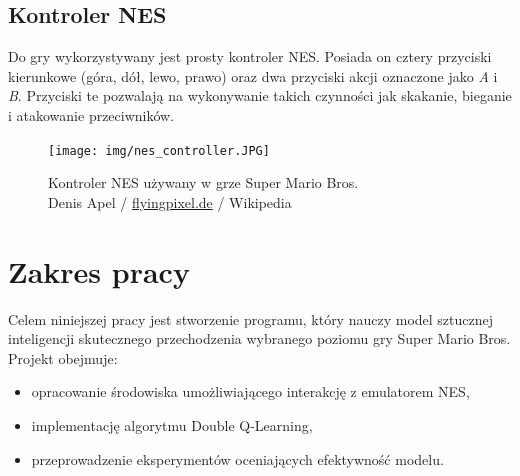 \subsection{Kontroler NES}

Do gry wykorzystywany jest prosty kontroler NES. Posiada on cztery przyciski kierunkowe (góra, dół, lewo, prawo) oraz dwa przyciski akcji oznaczone jako \textit{A} i \textit{B}. Przyciski te pozwalają na wykonywanie takich czynności jak skakanie, bieganie i atakowanie przeciwników.

\begin{figure}[h!]
	\centering
	\texttt{[image: img/nes\_controller.JPG]}
	\caption{Kontroler NES używany w grze Super Mario Bros.\\Denis Apel / \url{flyingpixel.de} / Wikipedia}
	\label{fig:nes_controller}
\end{figure}

\section{Zakres pracy}
Celem niniejszej pracy jest stworzenie programu, który nauczy model sztucznej inteligencji skutecznego przechodzenia wybranego poziomu gry Super Mario Bros. Projekt obejmuje:
\begin{itemize}
	\item opracowanie środowiska umożliwiającego interakcję z emulatorem NES,
	\item implementację algorytmu Double Q-Learning,
	\item przeprowadzenie eksperymentów oceniających efektywność modelu.
\end{itemize}
